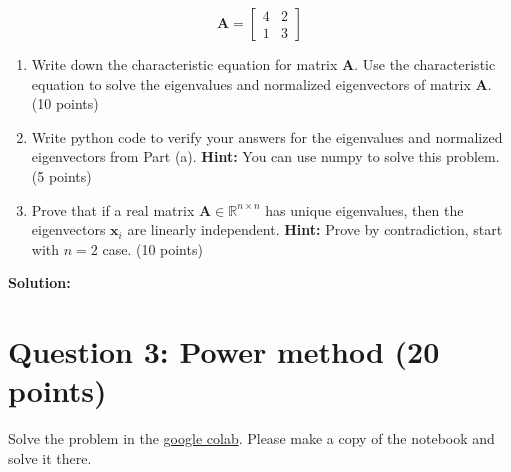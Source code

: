 \documentclass[11pt]{article}
\begin{document}
$$
\mathbf{A} = \begin{bmatrix}
    4 & 2\\
    1 & 3
\end{bmatrix}
$$

\begin{enumerate}
    \item[(a)] Write down the characteristic equation for matrix $\mathbf{A}$. Use the characteristic equation to solve the eigenvalues and normalized eigenvectors of matrix $\mathbf{A}$. (10 points)
    \item[(b)] Write python code to verify your answers for the eigenvalues and normalized eigenvectors from Part (a). \textbf{Hint:} You can use numpy to solve this problem. (5 points)
    \item[(c)] Prove that if a real matrix $\mathbf{A} \in \mathbb{R}^{n \times n}$ has unique eigenvalues, then the eigenvectors $\mathbf{x}_i$ are linearly independent. \textbf{Hint:} Prove by contradiction, start with $n=2$ case. (10 points)
\end{enumerate}

\textbf{Solution:}

\bigskip

\newpage
\section*{Question 3: Power method (20 points)}

Solve the problem in the \href{https://drive.google.com/file/d/1HQRlmo1zC6ZyeMCt-B278iOXQMfdmMRJ/view?usp=drive_link}{google colab}. Please make a copy of the notebook and solve it there.
\end{document}
